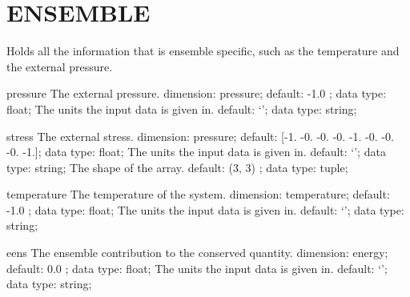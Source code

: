 \section{ENSEMBLE}
\label{ENSEMBLE}
\begin{ipifield}{}%
{Holds all the information that is ensemble specific, such as the temperature and the external pressure.}%
{}%
{}
\begin{ipifield}{pressure}%
{The external pressure.}%
{dimension: pressure; default:  -1.0 ; data type: float; }%
{%
{The units the input data is given in.}%
{default: `'; data type: string; }%
}
\end{ipifield}
\begin{ipifield}{stress}%
{The external stress.}%
{dimension: pressure; default: 
      [-1. -0. -0. -0. -1. -0. -0. -0. -1.]; data type: float; }%
{%
{The units the input data is given in.}%
{default: `'; data type: string; }%
%
{The shape of the array.}%
{default:  (3, 3) ; data type: tuple; }%
}
\end{ipifield}
\begin{ipifield}{temperature}%
{The temperature of the system.}%
{dimension: temperature; default:  -1.0 ; data type: float; }%
{%
{The units the input data is given in.}%
{default: `'; data type: string; }%
}
\end{ipifield}
\begin{ipifield}{eens}%
{The ensemble contribution to the conserved quantity.}%
{dimension: energy; default:  0.0 ; data type: float; }%
{%
{The units the input data is given in.}%
{default: `'; data type: string; }%
}
\end{ipifield}
\end{ipifield}
